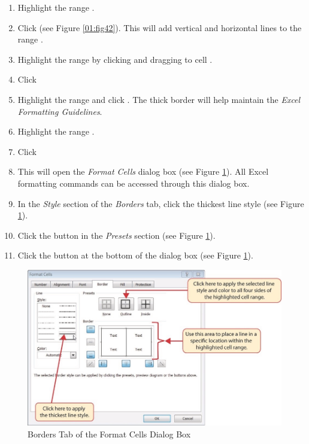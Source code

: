 \begin{enumbox}
\begin{enumerate}
		\item Highlight the range . 
		\item Click  (see Figure \ref{01:fig42}). This will add vertical and horizontal lines to the range .
		\item Highlight the range  by clicking  and dragging to cell .
		\item Click 
		\item Highlight the range  and click . The thick border will help maintain the \textit{Excel Formatting Guidelines}.
		\item Highlight the range .
		\item Click 
		\item This will open the \textit{Format Cells} dialog box (see Figure \ref{01:fig43}). All Excel formatting commands can be accessed through this dialog box.
		\item In the \textit{Style} section of the \textit{Borders} tab, click the thickest line style (see Figure \ref{01:fig43}).
		\item Click the  button in the \textit{Presets} section (see Figure \ref{01:fig43}).
		\item Click the  button at the bottom of the dialog box (see Figure \ref{01:fig43}).
	\end{enumerate}
\end{enumbox}
	
\begin{figure}[H]
	\centering
	\includegraphics[width=\maxwidth{.95\linewidth}]{gfx/ch01_fig43}
	\caption{Borders Tab of the Format Cells Dialog Box}
	\label{01:fig43}
\end{figure}

